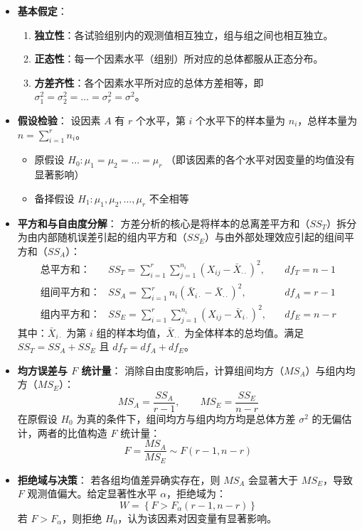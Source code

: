 \documentclass[a4paper]{ctexart}
\begin{document}
\begin{itemize}
    \item \textbf{基本假定}：
    \begin{enumerate}
        \item \textbf{独立性}：各试验组别内的观测值相互独立，组与组之间也相互独立。
        \item \textbf{正态性}：每一个因素水平（组别）所对应的总体都服从正态分布。
        \item \textbf{方差齐性}：各个因素水平所对应的总体方差相等，即 $\sigma_1^2 = \sigma_2^2 = \dots = \sigma_r^2 = \sigma^2$。
    \end{enumerate}

    \item \textbf{假设检验}：
    设因素 $A$ 有 $r$ 个水平，第 $i$ 个水平下的样本量为 $n_i$，总样本量为 $n = \sum_{i=1}^r n_i$。
    \begin{itemize}
        \item 原假设 $H_0: \mu_1 = \mu_2 = \dots = \mu_r$ （即该因素的各个水平对因变量的均值没有显著影响）
        \item 备择假设 $H_1: \mu_1, \mu_2, \dots, \mu_r$ 不全相等
    \end{itemize}

    \item \textbf{平方和与自由度分解}：
    方差分析的核心是将样本的总离差平方和（$SS_T$）拆分为由内部随机误差引起的组内平方和（$SS_E$）与由外部处理效应引起的组间平方和（$SS_A$）：
    \begin{align*}
        \text{总平方和：} & SS_T = \sum_{i=1}^r \sum_{j=1}^{n_i} (X_{ij} - \bar{X}_{\cdot\cdot})^2 , \quad & df_T = n - 1 \\
        \text{组间平方和：} & SS_A = \sum_{i=1}^r n_i (\bar{X}_{i\cdot} - \bar{X}_{\cdot\cdot})^2 , \quad & df_A = r - 1 \\
        \text{组内平方和：} & SS_E = \sum_{i=1}^r \sum_{j=1}^{n_i} (X_{ij} - \bar{X}_{i\cdot})^2 , \quad & df_E = n - r
    \end{align*}
    其中：$\bar{X}_{i\cdot}$ 为第 $i$ 组的样本均值，$\bar{X}_{\cdot\cdot}$ 为全体样本的总均值。满足 $SS_T = SS_A + SS_E$ 且 $df_T = df_A + df_E$。

    \item \textbf{均方误差与 $F$ 统计量}：
    消除自由度影响后，计算组间均方（$MS_A$）与组内均方（$MS_E$）：
    \[ MS_A = \frac{SS_A}{r - 1}, \qquad MS_E = \frac{SS_E}{n - r} \]
    在原假设 $H_0$ 为真的条件下，组间均方与组内均方均是总体方差 $\sigma^2$ 的无偏估计，两者的比值构造 $F$ 统计量：
    \[ F = \frac{MS_A}{MS_E} \sim F(r - 1, n - r) \]

    \item \textbf{拒绝域与决策}：
    若各组均值差异确实存在，则 $MS_A$ 会显著大于 $MS_E$，导致 $F$ 观测值偏大。给定显著性水平 $\alpha$，拒绝域为：
    \[ W = \left\{ F > F_{\alpha}(r - 1, n - r) \right\} \]
    若 $F > F_{\alpha}$，则拒绝 $H_0$，认为该因素对因变量有显著影响。
\end{itemize}
\end{document}
